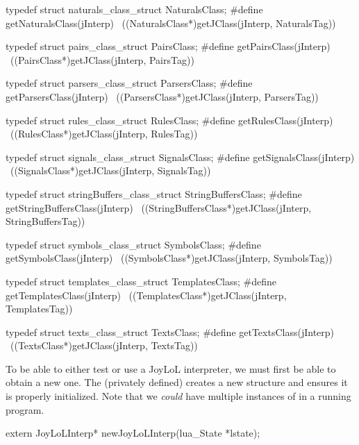 typedef struct naturals_class_struct NaturalsClass;
#define getNaturalsClass(jInterp)                           \
  ((NaturalsClass*)getJClass(jInterp, NaturalsTag))

typedef struct pairs_class_struct PairsClass;
#define getPairsClass(jInterp)                              \
  ((PairsClass*)getJClass(jInterp, PairsTag))

typedef struct parsers_class_struct ParsersClass;
#define getParsersClass(jInterp)                            \
  ((ParsersClass*)getJClass(jInterp, ParsersTag))

typedef struct rules_class_struct RulesClass;
#define getRulesClass(jInterp)                            \
  ((RulesClass*)getJClass(jInterp, RulesTag))

typedef struct signals_class_struct SignalsClass;
#define getSignalsClass(jInterp)                      \
  ((SignalsClass*)getJClass(jInterp, SignalsTag))

typedef struct stringBuffers_class_struct StringBuffersClass;
#define getStringBuffersClass(jInterp)                      \
  ((StringBuffersClass*)getJClass(jInterp, StringBuffersTag))

typedef struct symbols_class_struct SymbolsClass;
#define getSymbolsClass(jInterp)                            \
  ((SymbolsClass*)getJClass(jInterp, SymbolsTag))
  
typedef struct templates_class_struct TemplatesClass;
#define getTemplatesClass(jInterp)                          \
  ((TemplatesClass*)getJClass(jInterp, TemplatesTag))

typedef struct texts_class_struct TextsClass;
#define getTextsClass(jInterp)                              \
  ((TextsClass*)getJClass(jInterp, TextsTag))
\stopCHeader

\startTestSuite[newJoyLoLInterp]

To be able to either test or use a JoyLoL interpreter, we must first be 
able to obtain a new one. The (privately defined)  
creates a new \type{JoyLoLInterp} structure and ensures it is properly 
initialized. Note that we \emph{could} have multiple instances of 
\type{JoyLoLInterp} in a running program. 

\startCHeader
extern JoyLoLInterp* newJoyLoLInterp(lua_State *lstate);
\stopCHeader
\setCHeaderStream{public}

